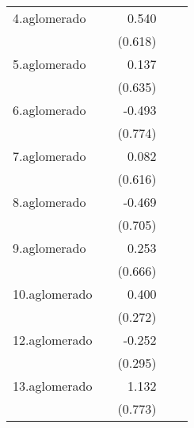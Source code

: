 {\begin{longtable}{l*{4}{D{.}{.}{-1}}}
\addlinespace
4.aglomerado&                     &       0.540         &                     &                     \\
            &                     &     (0.618)         &                     &                     \\
\addlinespace
5.aglomerado&                     &       0.137         &                     &                     \\
            &                     &     (0.635)         &                     &                     \\
\addlinespace
6.aglomerado&                     &      -0.493         &                     &                     \\
            &                     &     (0.774)         &                     &                     \\
\addlinespace
7.aglomerado&                     &       0.082         &                     &                     \\
            &                     &     (0.616)         &                     &                     \\
\addlinespace
8.aglomerado&                     &      -0.469         &                     &                     \\
            &                     &     (0.705)         &                     &                     \\
\addlinespace
9.aglomerado&                     &       0.253         &                     &                     \\
            &                     &     (0.666)         &                     &                     \\
\addlinespace
10.aglomerado&                     &       0.400         &                     &                     \\
            &                     &     (0.272)         &                     &                     \\
\addlinespace
12.aglomerado&                     &      -0.252         &                     &                     \\
            &                     &     (0.295)         &                     &                     \\
\addlinespace
13.aglomerado&                     &       1.132         &                     &                     \\
            &                     &     (0.773)         &                     &                     \\

\end{longtable}}
